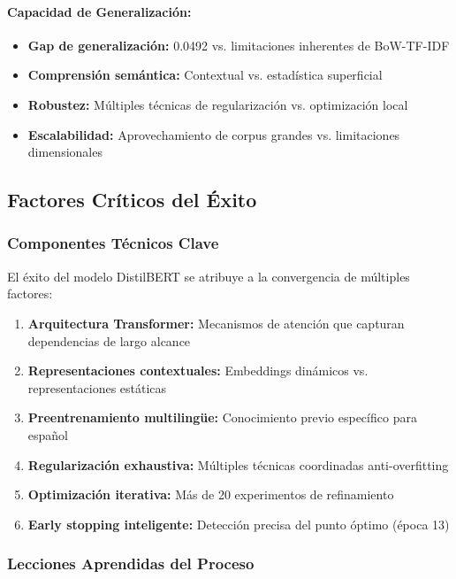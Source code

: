 \paragraph{Capacidad de Generalización:}
\begin{itemize}
    \item \textbf{Gap de generalización:} 0.0492 vs. limitaciones inherentes de BoW-TF-IDF
    \item \textbf{Comprensión semántica:} Contextual vs. estadística superficial
    \item \textbf{Robustez:} Múltiples técnicas de regularización vs. optimización local
    \item \textbf{Escalabilidad:} Aprovechamiento de corpus grandes vs. limitaciones dimensionales
\end{itemize}

\subsection{Factores Críticos del Éxito}
\label{subsec:factores_exito_distilbert}

\subsubsection{Componentes Técnicos Clave}

El éxito del modelo DistilBERT se atribuye a la convergencia de múltiples factores:

\begin{enumerate}
    \item \textbf{Arquitectura Transformer:} Mecanismos de atención que capturan dependencias de largo alcance
    \item \textbf{Representaciones contextuales:} Embeddings dinámicos vs. representaciones estáticas
    \item \textbf{Preentrenamiento multilingüe:} Conocimiento previo específico para español
    \item \textbf{Regularización exhaustiva:} Múltiples técnicas coordinadas anti-overfitting
    \item \textbf{Optimización iterativa:} Más de 20 experimentos de refinamiento
    \item \textbf{Early stopping inteligente:} Detección precisa del punto óptimo (época 13)
\end{enumerate}

\subsubsection{Lecciones Aprendidas del Proceso}

